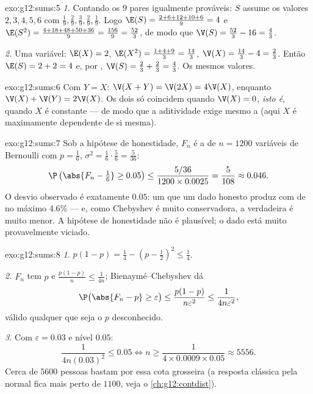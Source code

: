 \begin{solution}{exo:g12:sums:5}
\emph{1.} Contando os $9$ pares igualmente prováveis: $S$ assume os
valores $2, 3, 4, 5, 6$ com 
$\frac19, \frac29, \frac39, \frac29, \frac19$. Logo
$\E(S) = \frac{2 + 6 + 12 + 10 + 6}{9} = 4$ e
$\E(S^2) = \frac{4 + 18 + 48 + 50 + 36}{9} = \frac{156}{9} = \frac{52}{3}$,
de modo que $\V(S) = \frac{52}{3} - 16 = \frac43$.

\emph{2.} Uma variável: $\E(X) = 2$,
$\E(X^2) = \frac{1 + 4 + 9}{3} = \frac{14}{3}$,
$\V(X) = \frac{14}{3} - 4 = \frac23$. Então $\E(S) = 2 + 2 = 4$ e, por
, $\V(S) = \frac23 + \frac23 = \frac43$. Os mesmos valores.
\end{solution}

\begin{solution}{exo:g12:sums:6}
Com $Y = X$: $\V(X + Y) = \V(2X) = 4\V(X)$, enquanto
$\V(X) + \V(Y) = 2\V(X)$. Os dois só coincidem quando $\V(X) = 0$,
\emph{isto é}, quando $X$ é constante --- de modo que a aditividade exige
mesmo a  (aqui $X$ é maximamente dependente de si mesma).
\end{solution}

\begin{solution}{exo:g12:sums:7}
Sob a hipótese de honestidade, $F_n$ é a  de $n = 1200$ variáveis de
Bernoulli com $p = \frac16$, $\sigma^2 = \frac16\cdot\frac56
= \frac{5}{36}$:
\[
\P\left(\abs{F_n - \tfrac16} \geq 0.05\right)
\leq \frac{5/36}{1200 \times 0.0025} = \frac{5}{108} \approx 0.046 .
\]
O desvio observado é exatamente $0.05$: um  que um dado honesto
produz com  de no máximo $4.6\%$ --- e, como Chebyshev é
muito conservadora, a  verdadeira é muito menor. A hipótese
de honestidade não é plausível; o dado está muito provavelmente viciado.
\end{solution}

\begin{solution}{exo:g12:sums:8}
\emph{1.} $p(1-p) = \frac14 - \left(p - \frac12\right)^2 \leq \frac14$.

\emph{2.} $F_n$ tem  $p$ e 
$\frac{p(1-p)}{n} \leq \frac{1}{4n}$; Bienaymé--Chebyshev dá
\[
\P\bigl(\abs{F_n - p} \geq \varepsilon\bigr)
\leq \frac{p(1-p)}{n\varepsilon^2} \leq \frac{1}{4n\varepsilon^2},
\]
válido qualquer que seja o $p$ desconhecido.

\emph{3.} Com $\varepsilon = 0.03$ e nível $0.05$:
\[
\frac{1}{4n(0.03)^2} \leq 0.05
\iff n \geq \frac{1}{4 \times 0.0009 \times 0.05} \approx 5556 .
\]
Cerca de $5600$ pessoas bastam por essa cota grosseira (a resposta
clássica pela  normal fica mais perto de $1100$, veja o
\cref{ch:g12:contdist}).
\end{solution}

